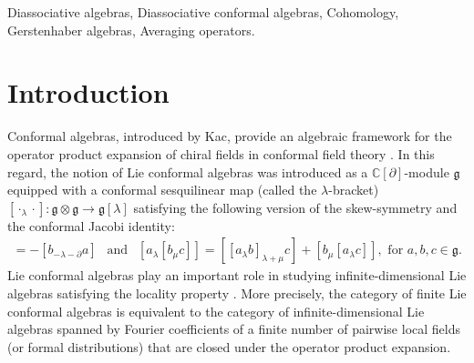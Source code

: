 \documentclass[a4paper,reqno,10pt]{amsart}
\theoremstyle{plain}
\theoremstyle{definition}
\theoremstyle{remark}
\newcommand{\C}{\mathbb{C}}
\newcommand{\p}{\partial}
\newcommand{\la}{\lambda}
\begin{document}
 Diassociative algebras, Diassociative conformal algebras, Cohomology, Gerstenhaber algebras, Averaging operators.


\noindent

\thispagestyle{empty}




\tableofcontents


\section{Introduction}\label{sec1}
Conformal algebras, introduced by Kac, provide an algebraic framework for the operator product expansion of chiral fields in conformal field theory \cite{ bor, bpz, kac-1}. In this regard, the notion of Lie conformal algebras was introduced as a $\C[\p]$-module $\mathfrak{g}$ equipped with a {conformal sesquilinear} map (called the $\la$-bracket) $[\cdot_{\la}\cdot]: \mathfrak{g} \otimes \mathfrak{g} \to \mathfrak{g}[\la]$ satisfying the following version of the skew-symmetry and the conformal Jacobi identity:
\begin{align*}
[a_{\la}b] = -[b_{-\la -\p}a] ~~ \text{ and } ~~  [a_{\la}[b_{\mu}c]]=[[a_{\la}b]_{\la +\mu} c] +[b_{\mu}[a_{\la} c]], \text{ for } a,b,c \in \mathfrak{g}.
\end{align*}
Lie conformal algebras play an important role in studying infinite-dimensional Lie algebras satisfying the locality property \cite{andrea-kac, kac-2}. More precisely, the category of finite Lie conformal algebras is equivalent to the category of infinite-dimensional Lie algebras spanned by Fourier coefficients of a finite number of pairwise local fields (or formal distributions) that are closed under the operator product expansion.
\end{document}
